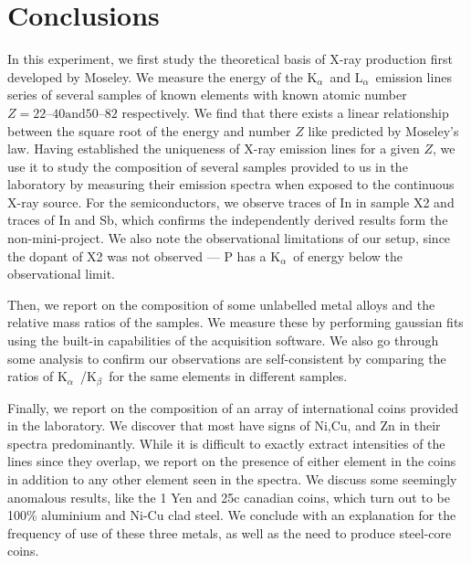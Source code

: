 \documentclass[11pt,a4paper,twoside,onecolumn]{article}
\newcommand{\Kalpha}{$\mathrm{K}_\alpha$~}
\newcommand{\Kbeta}{$\mathrm{K}_\beta$~}
\newcommand{\Lalpha}{$\mathrm{L}_\alpha$~}
\begin{document}
\section{Conclusions}
In this experiment, we first study the theoretical basis of X-ray production first developed by Moseley. We measure the energy of the \Kalpha and \Lalpha emission lines series of several samples of known elements with known atomic number $Z=\numrange{22}{40} \mathrm{and} \numrange{50}{82}$ respectively. We find that there exists a linear relationship between the square root of the energy and number $Z$ like predicted by Moseley's law. Having established the uniqueness of X-ray emission lines for a given $Z$, we use it to study the composition of several samples provided to us in the laboratory by measuring their emission spectra when exposed to the continuous X-ray source. For the semiconductors, we observe traces of In in sample X2 and traces of In and Sb, which confirms the independently derived results form the non-mini-project. We also note the observational limitations of our setup, since the dopant of X2 was not observed --- P has a \Kalpha of energy below the observational limit.

Then, we report on the composition of some unlabelled metal alloys and the relative mass ratios of the samples. We measure these by performing gaussian fits using the built-in capabilities of the acquisition software. We also go through some analysis to confirm our observations are self-consistent by comparing the ratios of \Kalpha/\Kbeta for the same elements in different samples.

Finally, we report on the composition of an array of international coins provided in the laboratory. We discover that most have signs of Ni,Cu, and Zn in their spectra predominantly. While it is difficult to exactly extract intensities of the lines since they overlap, we report on the presence of either element in the coins in addition to any other element seen in the spectra. We discuss some seemingly anomalous results, like the 1 Yen and 25c canadian coins, which turn out to be 100\% aluminium and Ni-Cu clad steel. We conclude with an explanation for the frequency of use of these three metals, as well as the need to produce steel-core coins.




\newpage
\appendix
\renewcommand\thesection{Appendix \Alph{section}}
\renewcommand{\thetable}{\Alph{section}\arabic{table}}
\setcounter{table}{0}
\renewcommand{\thefigure}{\Alph{section}\arabic{figure}}
\setcounter{figure}{0}
\renewcommand{\sectionmark}[1]{\markboth{\thesection.\ #1}{}}
\end{document}

